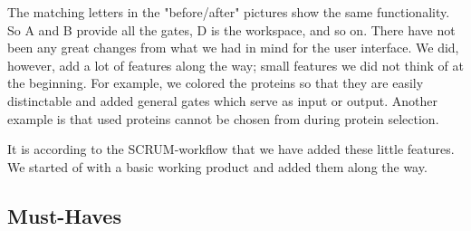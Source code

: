 \documentclass[a4paper]{article}
\begin{document}
The matching letters in the "before/after" pictures show the same functionality. So A and B provide all the gates, D is the workspace, and so on. There have not been any great changes from what we had in mind for the user interface. We did, however, add a lot of features along the way; small features we did not think of at the beginning. For example, we colored the proteins so that they are easily distinctable and added general gates which serve as input or output. Another example is that used proteins cannot be chosen from during protein selection.

It is according to the SCRUM-workflow that we have added these little features. We started of with a basic working product and added them along the way.

\subsection{Must-Haves}
\end{document}
